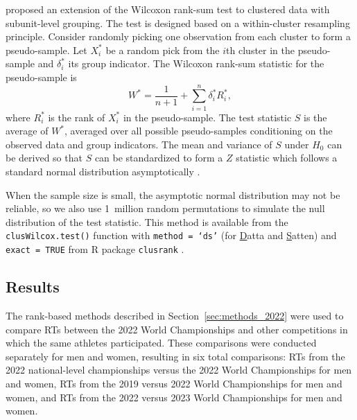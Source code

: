 \documentclass[12pt, letterpaper]{article}
\begin{document}
\citet{datta2005rank} proposed an extension of the Wilcoxon rank-sum test to
clustered data with subunit-level grouping. The test is designed based on a
within-cluster resampling principle. Consider randomly picking one observation
from each cluster to form a pseudo-sample. Let $X_i^*$ be a random pick from the
$i$th cluster in the pseudo-sample and $\delta_i^*$ its group indicator. The
Wilcoxon rank-sum statistic for the pseudo-sample is
\[
W^* = \frac{1}{n + 1} + \sum_{i=1}^{n} \delta_{i}^{*} R_{i}^{*},
\]
where $R_{i}^{*}$ is the rank of $X_{i}^{*}$ in the pseudo-sample.
The test statistic $S$ is the average of $W^*$, averaged over all possible
pseudo-samples conditioning on the observed data and group indicators.
The mean and variance of $S$ under $H_0$ can be derived so that $S$ can be
standardized to form a $Z$ statistic which follows a standard normal distribution
asymptotically \citep[p.910]{datta2005rank}.


When the sample size is small, the asymptotic normal distribution may
not be reliable, so we also use 1~million random permutations to
simulate the null distribution of the test statistic.
This method is available from the \texttt{clusWilcox.test()} function
with \texttt{method = `ds'} (for \underline{D}atta and \underline{S}atten) and
\texttt{exact = TRUE} from R package
\texttt{clusrank} \citep{jiang2020wilcoxon}.


\subsection{Results}
\label{sec:results_2022}


The rank-based methods described in Section~\ref{sec:methods_2022} were used to
compare RTs between the 2022 World Championships and other
competitions in which the same athletes participated. These comparisons
were conducted separately for men and women, resulting in six total
comparisons: RTs from the 2022 national-level championships
versus the 2022 World Championships for men and women, RTs
from the 2019 versus 2022 World Championships for men and women, and
RTs from the 2022 versus 2023 World Championships for men and
women.
\end{document}
